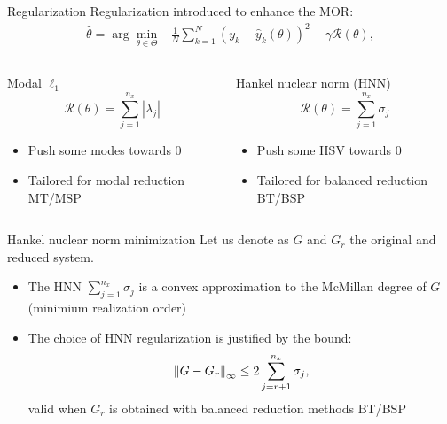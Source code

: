 \documentclass{beamer}
\begin{document}
\begin{frame}{Regularization}
Regularization introduced to enhance the MOR:
\begin{align*}
\hat{\theta} =  \arg\min_{\theta \in \Theta}  & \frac{1}{N}\sum_{k=1}^N \left(y_k - \hat{y}_k(\theta) \right)^2 +  \gamma \mathcal{R}(\theta),  
\end{align*}

\begin{columns}
\begin{block}{Modal $\ell_1$}
\begin{equation*}
    \mathcal{R}(\theta) = \sum_{j=1}^{n_x} |\lambda_j|
\end{equation*}
\begin{itemize}
\item Push some modes towards 0
\item Tailored for modal reduction MT/MSP
\end{itemize}

\end{block}
\begin{block}{Hankel nuclear norm (HNN)} 
\begin{equation*}
	\mathcal{R}(\theta) = \sum_{j=1}^{n_x} \sigma_j
\end{equation*}
\begin{itemize}
\item Push some HSV  towards 0
\item Tailored for balanced reduction BT/BSP
\end{itemize}
\end{block}
\end{columns}
\end{frame}

\begin{frame}{Hankel nuclear norm minimization}
Let us denote as $G$ and $G_r$ the original and reduced system.\\
\begin{itemize}
\item The HNN $\sum_{j=1}^{n_x} \sigma_j$ is a convex approximation to the McMillan degree of $G$ (minimium realization order)
\item The choice of HNN regularization is justified by the bound:
\begin{equation*}
\left \lVert G-G_r \right \rVert_{\infty} \leq 2\sum \limits_{j=r+1}^{n_x}\sigma_j,
\end{equation*}
valid when $G_r$ is obtained with balanced reduction methods BT/BSP
\end{itemize}
\end{frame}
\end{document}
